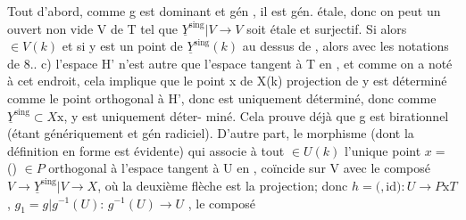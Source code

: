 Tout d'abord, comme g est dominant et gén  , il est
gén. étale, donc on peut  un ouvert non vide V de T tel que
$\underline{Y}^{\text{sing}}|V \longrightarrow V$ soit étale et surjectif. Si alors \hand{$\xi$}$\in V(k)$ et si y est
un point de $\underline{Y}^{\text{sing}}(k)$ au dessus de \hand{$\xi$}, alors avec les notations de
8.. c)  l'espace H' n'est autre que l'espace tangent à T en \hand{$\xi$},
et comme on a noté à cet endroit, cela implique que le point x de X(k)
projection de y est déterminé comme le point orthogonal à H', donc est
uniquement déterminé, donc comme $\underline{Y}^{\text{sing}}\subset X\text{x}$, y est uniquement déter-%
miné. Cela prouve déjà que g est birationnel (étant  
génériquement   et gén radiciel). 
D'autre part, le morphisme \hand{$\unsure{\nu|\gamma}$}(dont la définition en forme est évidente)
qui associe à tout $\in U(k)$ l'unique point $x=$ \hand{$\nu$}(\hand{$\xi$}) $\in P$ orthogonal à
l'espace tangent à U en \hand{$\xi$}, coïncide sur V avec le composé
$V\rightarrow \underline{Y}^{\text{sing}}|V \longrightarrow X$, où la deuxième flèche est la projection; donc
  $h=($\hand{$\nu$}$,\mathrm{id}) : U\rightarrow P\text{x}T$ , 
 $g_1 = g|g^{-1}(U)$\xout{=}: $g^{-1}(U)\rightarrow U$ , le composé

